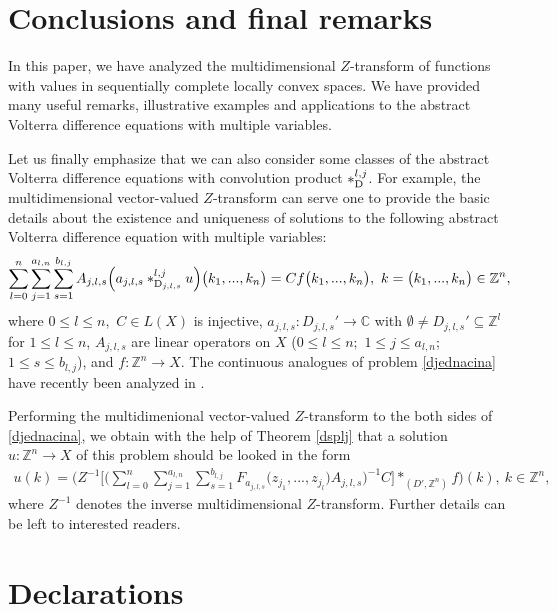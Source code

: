 \documentclass{amsart}
\theoremstyle{definition}
\theoremstyle{remark}
\numberwithin{equation}{section}
\begin{document}
\section{Conclusions and final remarks}\label{rema}

In this paper, we have analyzed the multidimensional $Z$-transform of functions with values in sequentially complete locally convex spaces. We have provided many useful remarks, illustrative examples and applications to the abstract Volterra difference equations with multiple variables.

Let us finally emphasize that we can also consider some classes of the abstract Volterra difference equations with convolution product $\ast_{{\rm D}}^{l,j}$. For example, the multidimensional vector-valued $Z$-transform can serve one to provide the basic details about the existence and uniqueness of solutions to the following abstract Volterra difference equation with multiple variables:
\begin{align}\label{djednacina}
\sum_{l=0}^{n}\sum_{j=1}^{a_{l,n}}\sum_{s=1}^{b_{l,j}}A_{j,l,s}\Bigl( a_{j,l,s}\ast^{l,j}_{{\rm D}_{j,l,s}}u\Bigr)\bigl(k_{1},...,k_{n}\bigr)=Cf\bigl(k_{1},...,k_{n}\bigr),\ k=\bigl(k_{1},...,k_{n}\bigr) \in {\mathbb Z}^{n},
\end{align}
where $0\leq l\leq n,$ $C\in L(X)$ is injective, $a_{j,l,s} : D_{j,l,s}'\rightarrow {\mathbb C}$ with $\emptyset \neq D_{j,l,s}'\subseteq {\mathbb Z}^{l}$ for $1\leq l\leq n$, $A_{j,l,s}$ are linear operators on $X$ ($0\leq l\leq n;$ $1\leq j\leq a_{l,n}$; $1\leq s\leq b_{l,j}$), and $f : {\mathbb Z}^{n} \rightarrow X $. The continuous analogues of problem \eqref{djednacina} have recently been analyzed in \cite{mvlt}.

Performing the multidimenional vector-valued $Z$-transform to the both sides of \eqref{djednacina}, we obtain with the help of Theorem \ref{dsplj} that a solution $u :  {\mathbb Z}^{n} \rightarrow X$ of this problem should be looked in the form{\small
\begin{align*}
u(k)=\Biggl(Z^{-1}\Biggl[\Biggl( \sum_{l=0}^{n}\sum_{j=1}^{a_{l,n}}\sum_{s=1}^{b_{l,j}}F_{a_{j,l,s}}\bigl(z_{j_{1}},...,z_{j_{l}} \bigr) A_{j,l,s}\Biggr)^{-1}C\Biggr] \ast_{(D',{\mathbb Z}^{n})}f\Biggr)(k),\ k\in {\mathbb Z}^{n},
\end{align*}}where $Z^{-1}$ denotes the inverse multidimensional $Z$-transform. Further details can be left to interested readers.

\section*{Declarations}
\end{document}
